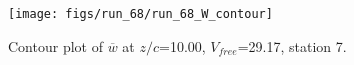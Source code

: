 \begin{figure}[H]
\centering
\texttt{[image: figs/run\_68/run\_68\_W\_contour]}
\caption{Contour plot of $\overline{w}$ at $z/c$=10.00, $V_{free}$=29.17, station 7.}
\end{figure}


